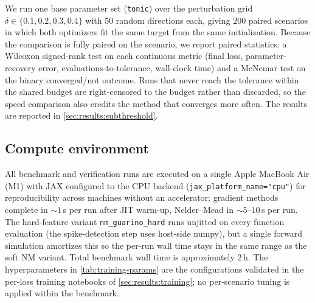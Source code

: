 We run one base parameter set (\texttt{tonic}) over the perturbation grid $\delta\in\{0.1,0.2,0.3,0.4\}$ with $50$ random directions each,
giving $200$ paired scenarios in which both optimizers fit the same target from the same initialization.
Because the comparison is fully paired on the scenario, we report paired statistics:
a Wilcoxon signed-rank test on each continuous metric (final loss, parameter-recovery error, evaluations-to-tolerance, wall-clock time)
and a McNemar test on the binary converged/not outcome.
Runs that never reach the tolerance within the shared budget are right-censored to the budget rather than discarded, so the speed comparison also credits the method that converges more often.
The results are reported in \cref{sec:results:subthreshold}.

\subsection{Compute environment}\label{sec:method:compute-environment}
All benchmark and verification runs are executed on a single Apple MacBook Air (M1) with JAX configured to the CPU backend (\texttt{jax\_platform\_name="cpu"}) for reproducibility across machines without an accelerator;
gradient methods complete in $\sim 1$\,s per run after \gls{JIT} warm-up, Nelder--Mead in $\sim 5$--$10$\,s per run.
The hard-feature variant \texttt{nm\_guarino\_hard} runs unjitted on every function evaluation (the spike-detection step uses host-side numpy), but a single forward simulation amortizes this so the per-run wall time stays in the same range as the soft NM variant.
Total benchmark wall time is approximately $2$\,h.
The hyperparameters in \cref{tab:training-params} are the configurations validated in the per-loss training notebooks of \cref{sec:results:training};
no per-scenario tuning is applied within the benchmark.


